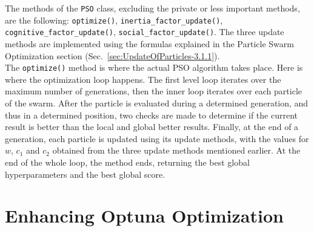 %
The methods of the \texttt{PSO} class, excluding the private or less important methods, are the following: \texttt{optimize()}, \texttt{inertia\_factor\_update()}, \texttt{cognitive\_factor\_update()}, \texttt{social\_factor\_update()}.
The three update methods are implemented using the formulas explained in the Particle Swarm Optimization section (Sec.~\ref{sec:UpdateOfParticles-3.1.1}).
\\[0.3cm]The \texttt{optimize()} method is where the actual PSO algorithm takes place. Here is where the optimization loop happens. The first level loop iterates over the maximum number of generations, then the inner loop iterates over each particle of the swarm.
After the particle is evaluated during a determined generation, and thus in a determined position, two checks are made to determine if the current result is better than the local and global better results.
Finally, at the end of a generation, each particle is updated using its update methods, with the values for $w$, $c_1$ and $c_2$ obtained from the three update methods mentioned earlier.
At the end of the whole loop, the method ends, returning the best global hyperparameters and the best global score.

\section{Enhancing Optuna Optimization}\label{sec:EnhancingOptuna-3.3}

